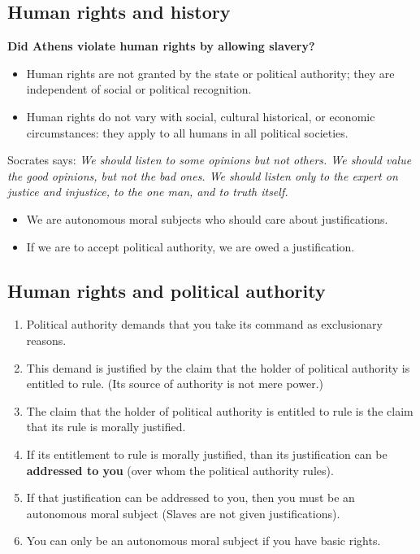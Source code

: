 \subsection{Human rights and history}

\textbf{Did Athens violate human rights by allowing slavery?}
\begin{itemize}
    \item Human rights are not granted by the state or political authority;
    they are independent of social or political recognition.
    \item Human rights do not vary with social, cultural historical, or
    economic circumstances: they apply to all humans in all political
    societies.
\end{itemize}

Socrates says:
\textit{We should listen to some opinions but not others. We should value the
good opinions, but not the bad ones. We should listen only to the expert on
justice and injustice, to the one man, and to truth itself.}

\begin{itemize}
    \item We are autonomous moral subjects who should care about
    justifications.
    \item If we are to accept political authority, we are owed a
    justification.
\end{itemize}

\subsection{Human rights and political authority}

\begin{enumerate}
    \item Political authority demands that you take its command as
    exclusionary reasons.
    \item This demand is justified by the claim that the holder of political
    authority is entitled to rule. (Its source of authority is not mere
    power.)
    \item The claim that the holder of political authority is entitled to
    rule is the claim that its rule is morally justified.
    \item If its entitlement to rule is morally justified, than its
    justification can be \textbf{addressed to you} (over whom the
    political authority rules).
    \item If that justification can be addressed to you, then you must be
    an autonomous moral subject (Slaves are not given justifications).
    \item You can only be an autonomous moral subject if you have basic
    rights.
\end{enumerate}

